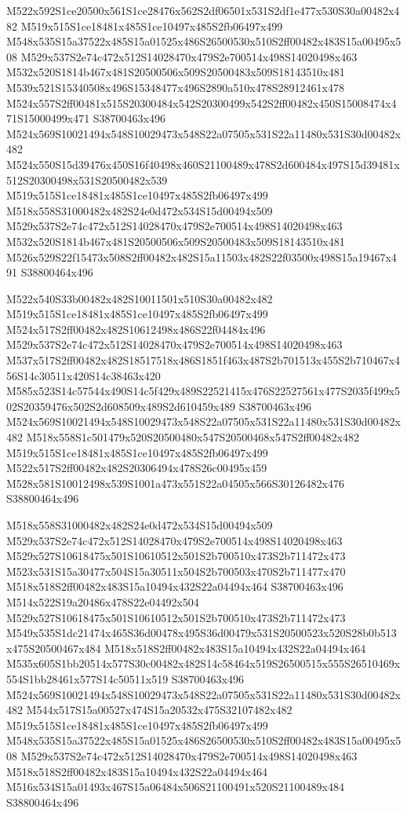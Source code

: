 \documentclass{article}
\begin{document}
\begin{multicols}{2}
M522x592S1ce20500x561S1ce28476x562S2df06501x531S2df1e477x530S30a00482x482 M519x515S1ce18481x485S1ce10497x485S2fb06497x499 M548x535S15a37522x485S15a01525x486S26500530x510S2ff00482x483S15a00495x508 M529x537S2e74c472x512S14028470x479S2e700514x498S14020498x463 M532x520S1814b467x481S20500506x509S20500483x509S18143510x481 M539x521S15340508x496S15348477x496S2890a510x478S28912461x478 M524x557S2ff00481x515S20300484x542S20300499x542S2ff00482x450S15008474x471S15000499x471 S38700463x496 M524x569S10021494x548S10029473x548S22a07505x531S22a11480x531S30d00482x482 M524x550S15d39476x450S16f40498x460S21100489x478S2d600484x497S15d39481x512S20300498x531S20500482x539 M519x515S1ce18481x485S1ce10497x485S2fb06497x499 M518x558S31000482x482S24e0d472x534S15d00494x509 M529x537S2e74c472x512S14028470x479S2e700514x498S14020498x463 M532x520S1814b467x481S20500506x509S20500483x509S18143510x481 M526x529S22f15473x508S2ff00482x482S15a11503x482S22f03500x498S15a19467x491 S38800464x496

M522x540S33b00482x482S10011501x510S30a00482x482 M519x515S1ce18481x485S1ce10497x485S2fb06497x499 M524x517S2ff00482x482S10612498x486S22f04484x496 M529x537S2e74c472x512S14028470x479S2e700514x498S14020498x463 M537x517S2ff00482x482S18517518x486S1851f463x487S2b701513x455S2b710467x456S14c30511x420S14c38463x420 M585x523S14c57544x490S14c5f429x489S22521415x476S22527561x477S2035f499x502S20359476x502S2d608509x489S2d610459x489 S38700463x496 M524x569S10021494x548S10029473x548S22a07505x531S22a11480x531S30d00482x482 M518x558S1c501479x520S20500480x547S20500468x547S2ff00482x482 M519x515S1ce18481x485S1ce10497x485S2fb06497x499 M522x517S2ff00482x482S20306494x478S26c00495x459 M528x581S10012498x539S1001a473x551S22a04505x566S30126482x476 S38800464x496

M518x558S31000482x482S24e0d472x534S15d00494x509 M529x537S2e74c472x512S14028470x479S2e700514x498S14020498x463 M529x527S10618475x501S10610512x501S2b700510x473S2b711472x473 M523x531S15a30477x504S15a30511x504S2b700503x470S2b711477x470 M518x518S2ff00482x483S15a10494x432S22a04494x464 S38700463x496 M514x522S19a20486x478S22e04492x504 M529x527S10618475x501S10610512x501S2b700510x473S2b711472x473 M549x535S1dc21474x465S36d00478x495S36d00479x531S20500523x520S28b0b513x475S20500467x484 M518x518S2ff00482x483S15a10494x432S22a04494x464 M535x605S1bb20514x577S30c00482x482S14c58464x519S26500515x555S26510469x554S1bb28461x577S14c50511x519 S38700463x496 M524x569S10021494x548S10029473x548S22a07505x531S22a11480x531S30d00482x482 M544x517S15a00527x474S15a20532x475S32107482x482 M519x515S1ce18481x485S1ce10497x485S2fb06497x499 M548x535S15a37522x485S15a01525x486S26500530x510S2ff00482x483S15a00495x508 M529x537S2e74c472x512S14028470x479S2e700514x498S14020498x463 M518x518S2ff00482x483S15a10494x432S22a04494x464 M516x534S15a01493x467S15a06484x506S21100491x520S21100489x484 S38800464x496


\end{multicols}
\end{document}
